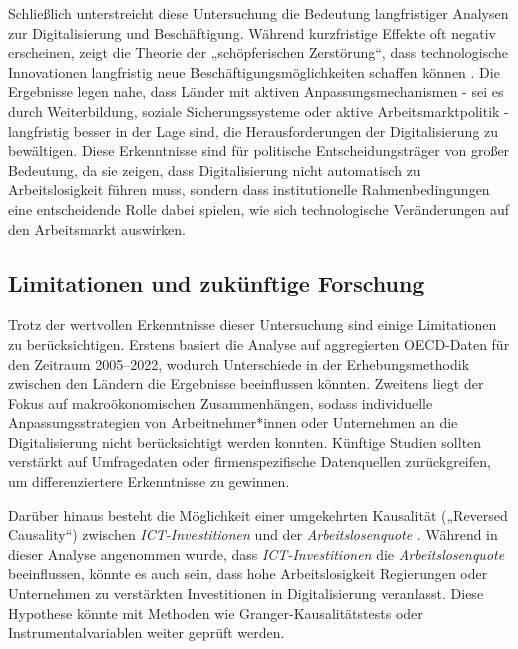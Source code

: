 Schließlich unterstreicht diese Untersuchung die Bedeutung langfristiger Analysen zur 
Digitalisierung und Beschäftigung. Während kurzfristige Effekte oft negativ erscheinen, 
zeigt die Theorie der „schöpferischen Zerstörung“, dass technologische Innovationen 
langfristig neue Beschäftigungsmöglichkeiten schaffen können 
\parencite[vgl.][S. 81–86]{schumpeter1976capitalism}. Die Ergebnisse legen nahe, dass 
Länder mit aktiven Anpassungsmechanismen - sei es durch Weiterbildung, soziale 
Sicherungssysteme oder aktive Arbeitsmarktpolitik - langfristig besser in der Lage sind, 
die Herausforderungen der Digitalisierung zu bewältigen. Diese Erkenntnisse sind für 
politische Entscheidungsträger von großer Bedeutung, da sie zeigen, dass Digitalisierung 
nicht automatisch zu Arbeitslosigkeit führen muss, sondern dass institutionelle 
Rahmenbedingungen eine entscheidende Rolle dabei spielen, wie sich technologische 
Veränderungen auf den Arbeitsmarkt auswirken.


\subsection{Limitationen und zukünftige Forschung}

Trotz der wertvollen Erkenntnisse dieser Untersuchung sind einige Limitationen zu 
berücksichtigen. Erstens basiert die Analyse auf aggregierten \ac{OECD}-Daten für den 
Zeitraum 2005–2022, wodurch Unterschiede in der Erhebungsmethodik zwischen den Ländern 
die Ergebnisse beeinflussen könnten. Zweitens liegt der Fokus auf makroökonomischen 
Zusammenhängen, sodass individuelle Anpassungsstrategien von Arbeitnehmer*innen oder 
Unternehmen an die Digitalisierung nicht berücksichtigt werden konnten. Künftige Studien 
sollten verstärkt auf Umfragedaten oder firmenspezifische Datenquellen zurückgreifen, um 
differenziertere Erkenntnisse zu gewinnen.

Darüber hinaus besteht die Möglichkeit einer umgekehrten Kausalität („Reversed Causality“) 
zwischen \textit{\ac{ICT}-Investitionen} und der \textit{Arbeitslosenquote} 
\parencite[vgl.][S. 159–160]{pearl2009causality}. Während in dieser Analyse angenommen wurde, 
dass \textit{\ac{ICT}-Investitionen} die \textit{Arbeitslosenquote} beeinflussen, könnte es 
auch sein, dass hohe Arbeitslosigkeit Regierungen oder Unternehmen zu verstärkten 
Investitionen in Digitalisierung veranlasst. Diese Hypothese könnte mit Methoden wie 
Granger-Kausalitätstests oder Instrumentalvariablen weiter geprüft werden.

